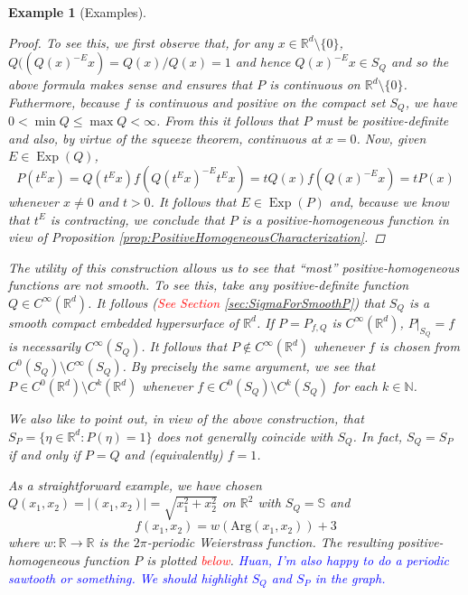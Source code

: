 \documentclass[11pt]{article}
\theoremstyle{theorem}
\newtheorem{example}{Example}
\newcommand*{\myproofname}{Proof}
\newenvironment{subproof}[1][\myproofname]{\begin{proof}[#1]\renewcommand*{\qedsymbol}{$\mathbin{/\mkern-6mu/}$}}{\end{proof}}
\newcommand\Exp{\operatorname{Exp}}
\begin{document}
\begin{example}[Examples]
\begin{enumerate}
\begin{subproof}To see this, we first observe that, for any $x\in\mathbb{R}^d\setminus \{0\}$, $Q((Q(x)^{-E}x)=Q(x)/Q(x)=1$ and hence $Q(x)^{-E}x\in S_Q$ and so the above formula makes sense and ensures that $P$ is continuous on $\mathbb{R}^d\setminus\{0\}$. Futhermore, because $f$ is continuous and positive on the compact set $S_Q$, we have $0<\min Q\leq \max Q<\infty$. From this it follows that $P$ must be positive-definite and also, by virtue of the squeeze theorem, continuous at $x=0$. Now, given $E\in\Exp(Q)$,
\begin{equation*}
P(t^Ex)=Q(t^Ex)f(Q(t^Ex)^{-E}t^Ex)=tQ(x)f(Q(x)^{-E}x)=tP(x)
\end{equation*}
whenever $x\neq 0$ and $t>0$. It follows that $E\in\Exp(P)$ and, because we know that $t^E$ is contracting, we conclude that $P$ is a positive-homogeneous function in view of Proposition \ref{prop:PositiveHomogeneousCharacterization}. 
\end{subproof}
 The utility of this construction allows us to see that ``most'' positive-homogeneous functions are not smooth. To see this, take any positive-definite function $Q\in C^{\infty}(\mathbb{R}^d)$. It follows (\textcolor{red}{See Section \ref{sec:SigmaForSmoothP}}) that $S_Q$ is a smooth compact embedded hypersurface of $\mathbb{R}^d$. If $P=P_{f,Q}$ is $C^\infty(\mathbb{R}^d)$, $P\vert_{S_Q}=f$ is necessarily $C^\infty(S_Q)$. It follows that $P\notin C^\infty(\mathbb{R}^d)$ whenever $f$ is chosen from $C^0(S_Q)\setminus C^\infty(S_Q)$. By precisely the same argument, we see that $P\in C^0(\mathbb{R}^d)\setminus C^k(\mathbb{R}^d)$ whenever $f\in C^0(S_Q)\setminus C^k(S_Q)$ for each $k\in\mathbb{N}$.

We also like to point out, in view of the above construction, that $S_P=\{\eta\in\mathbb{R}^d:P(\eta)=1\}$ does not generally coincide with $S_Q$. In fact, $S_Q=S_P$ if and only if $P=Q$ and (equivalently) $f=1$.

As a straightforward example, we have chosen $Q(x_1,x_2)=|(x_1,x_2)|=\sqrt{x_1^2+x_2^2}$ on $\mathbb{R}^2$ with $S_Q=\mathbb{S}$ and 
\begin{equation*}
f(x_1,x_2)=w(\mbox{Arg}(x_1,x_2))+3
\end{equation*}
where $w:\mathbb{R}\to\mathbb{R}$ is the $2\pi$-periodic Weierstrass function. The resulting positive-homogeneous function $P$ is plotted \textcolor{red}{below}. \textcolor{blue}{Huan, I'm also happy to do a periodic sawtooth or something. We should highlight $S_Q$ and $S_P$ in the graph.}
\end{enumerate}
\end{example}
\end{document}
